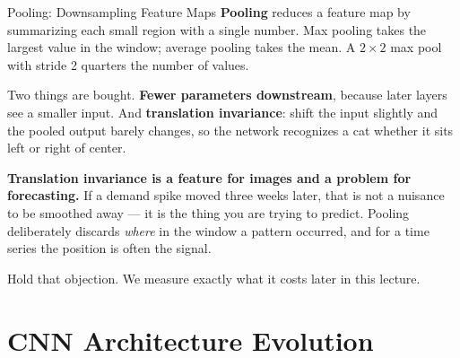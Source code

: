 \documentclass[aspectratio=169, 11pt]{beamer}
\begin{document}
\begin{frame}{Pooling: Downsampling Feature Maps}
  \textbf{Pooling} reduces a feature map by summarizing each small region with a single number.
  Max pooling takes the largest value in the window; average pooling takes the mean. A
  $2\times2$ max pool with stride 2 quarters the number of values.

  \vspace{0.15cm}
  Two things are bought. \textbf{Fewer parameters downstream}, because later layers see a smaller
  input. And \textbf{translation invariance}: shift the input slightly and the pooled output
  barely changes, so the network recognizes a cat whether it sits left or right of center.

  \begin{warningbox}
    \textbf{Translation invariance is a feature for images and a problem for forecasting.} If a
    demand spike moved three weeks later, that is not a nuisance to be smoothed away --- it is
    the thing you are trying to predict. Pooling deliberately discards \emph{where} in the window
    a pattern occurred, and for a time series the position is often the signal.
  \end{warningbox}

  \vspace{0.1cm}
  Hold that objection. We measure exactly what it costs later in this lecture.
\end{frame}

\section{CNN Architecture Evolution}

\end{document}
